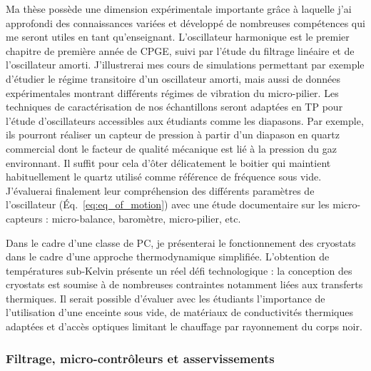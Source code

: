 \documentclass[12pt,a4paper]{article}
\begin{document}
Ma thèse possède une dimension expérimentale importante grâce à laquelle j'ai approfondi des connaissances variées et développé de nombreuses compétences qui me seront utiles en tant qu'enseignant.
L'oscillateur harmonique est le premier chapitre de première année de CPGE, suivi par l'étude du filtrage linéaire et de l'oscillateur amorti.
J'illustrerai mes cours de simulations permettant par exemple d'étudier le régime transitoire d'un oscillateur amorti, mais aussi de données expérimentales montrant différents régimes de vibration du micro-pilier.
Les techniques de caractérisation de nos échantillons seront adaptées en TP pour l'étude d'oscillateurs accessibles aux étudiants comme les diapasons.
Par exemple, ils pourront réaliser un capteur de pression à partir d'un diapason en quartz commercial dont le facteur de qualité mécanique est lié à la pression du gaz environnant.
Il suffit pour cela d'ôter délicatement le boitier qui maintient habituellement le quartz utilisé comme référence de fréquence sous vide.
J'évaluerai finalement leur compréhension des différents paramètres de l'oscillateur (\'Eq.~\eqref{eq:eq_of_motion}) avec une étude documentaire sur les micro-capteurs : micro-balance, baromètre, micro-pilier, etc.

Dans le cadre d'une classe de PC, je présenterai le fonctionnement des cryostats dans le cadre d'une approche thermodynamique simplifiée.
L'obtention de températures sub-Kelvin présente un réel défi technologique : la conception des cryostats est soumise à de nombreuses contraintes notamment liées aux transferts thermiques.
Il serait possible d'évaluer avec les étudiants l'importance de l'utilisation d'une enceinte sous vide, de matériaux de conductivités thermiques adaptées et d'accès optiques limitant le chauffage par rayonnement du corps noir.

\subsubsection{Filtrage, micro-contrôleurs et asservissements}
\label{sec:controls}
\end{document}
